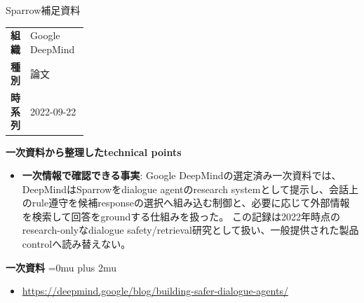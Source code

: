\begin{technicalnote}{Sparrow}{補足資料}
\begingroup
\begin{tabularx}{\linewidth}{@{}>{\bfseries}p{0.22\linewidth}X@{}}
組織 & Google DeepMind \\
種別 & 論文 \\
時系列 & 2022-09-22 \\
\end{tabularx}
\smallskip
{\bfseries 一次資料から整理したtechnical points}
\begin{itemize}[leftmargin=1.5em,itemsep=0.35em]
\item \textbf{一次情報で確認できる事実}: Google DeepMindの選定済み一次資料では、DeepMindはSparrowをdialogue agentのresearch systemとして提示し、会話上のrule遵守を候補responseの選択へ組み込む制御と、必要に応じて外部情報を検索して回答をgroundする仕組みを扱った。 この記録は2022年時点のresearch-onlyなdialogue safety/retrieval研究として扱い、一般提供された製品controlへ読み替えない。
\end{itemize}
\begin{minipage}{\linewidth}
\begin{samepage}
{\bfseries 一次資料}
\begingroup\sloppy
\Urlmuskip=0mu plus 2mu\relax
\begin{itemize}[leftmargin=1.5em,itemsep=0.25em]
\item {\scriptsize\url{https://deepmind.google/blog/building-safer-dialogue-agents/}}
\end{itemize}
\endgroup
\end{samepage}
\end{minipage}
\endgroup
\end{technicalnote}
\medskip

